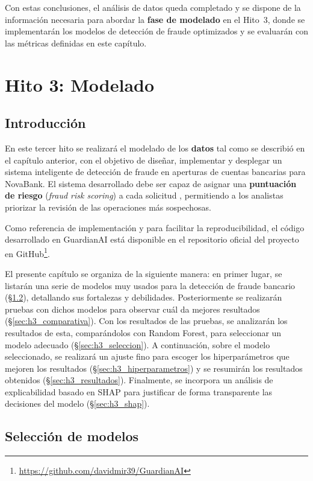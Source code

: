 \documentclass[12pt,a4paper]{report}
\begin{document}
Con estas conclusiones, el análisis de datos queda completado y se dispone de la información necesaria para abordar la \textbf{fase de modelado} en el Hito~3, donde se implementarán los modelos de detección de fraude optimizados y se evaluarán con las métricas definidas en este capítulo.

\chapter{Hito 3: Modelado}
\label{ch:hito3}

\section{Introducción}
\label{sec:h3_intro}

En este tercer hito se realizará el modelado de los \textbf{datos} tal como se describió en el capítulo anterior, con el objetivo de diseñar, implementar y desplegar un sistema inteligente de detección de fraude en aperturas de cuentas bancarias para NovaBank. El sistema desarrollado debe ser capaz de asignar una \textbf{puntuación de riesgo} (\textit{fraud risk scoring}) a cada solicitud \cite{fraudrisk2024}, permitiendo a los analistas priorizar la revisión de las operaciones más sospechosas.

Como referencia de implementación y para facilitar la reproducibilidad, el código desarrollado en GuardianAI está disponible en el repositorio oficial del proyecto en GitHub\footnote{\url{https://github.com/davidmir39/GuardianAI}}.

El presente capítulo se organiza de la siguiente manera: en primer lugar, se listarán una serie de modelos muy usados para la detección de fraude bancario (\S\ref{sec:h3_modelos}), detallando sus fortalezas y debilidades. Posteriormente se realizarán pruebas con dichos modelos para observar cuál da mejores resultados (\S\ref{sec:h3_comparativa}). Con los resultados de las pruebas, se analizarán los resultados de esta, comparándolos con Random Forest, para seleccionar un modelo adecuado (\S\ref{sec:h3_seleccion}). A continuación, sobre el modelo seleccionado, se realizará un ajuste fino para escoger los hiperparámetros que mejoren los resultados (\S\ref{sec:h3_hiperparametros}) y se resumirán los resultados obtenidos (\S\ref{sec:h3_resultados}). Finalmente, se incorpora un análisis de explicabilidad basado en SHAP para justificar de forma transparente las decisiones del modelo (\S\ref{sec:h3_shap}).

\section{Selección de modelos}
\label{sec:h3_modelos}
\end{document}

